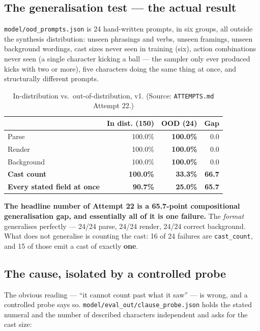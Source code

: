 \documentclass[11pt]{article}
\begin{document}
\subsection{The generalisation test --- the actual result}
\label{sec:generalisationtest}

\texttt{model/ood\_prompts.json} is 24 hand-written prompts, in six
groups, all outside the synthesis distribution: unseen phrasings and
verbs, unseen framings, unseen background wordings, cast sizes never seen
in training (six), action combinations never seen (a single character
kicking a ball --- the sampler only ever produced kicks with two or
more), five characters doing the same thing at once, and structurally
different prompts.

\begin{table}[h]
\centering
\caption{In-distribution vs.\ out-of-distribution, v1.
(Source: \texttt{ATTEMPTS.md} Attempt 22.)}
\label{tab:v1oodgap}
\begin{tabular}{@{}lrrr@{}}
\toprule
 & In dist. (150) & OOD (24) & Gap \\
\midrule
Parse & 100.0\% & \textbf{100.0\%} & 0.0 \\
Render & 100.0\% & \textbf{100.0\%} & 0.0 \\
Background & 100.0\% & \textbf{100.0\%} & 0.0 \\
\textbf{Cast count} & \textbf{100.0\%} & \textbf{33.3\%} & \textbf{66.7} \\
\textbf{Every stated field at once} & \textbf{90.7\%} & \textbf{25.0\%} & \textbf{65.7} \\
\bottomrule
\end{tabular}
\end{table}

\textbf{The headline number of Attempt 22 is a 65.7-point compositional
generalisation gap, and essentially all of it is one failure.} The
\emph{format} generalises perfectly --- 24/24 parse, 24/24 render, 24/24
correct background. What does not generalise is counting the cast: 16 of
24 failures are \texttt{cast\_count}, and 15 of those emit a cast of
exactly \textbf{one}.

\subsection{The cause, isolated by a controlled probe}
\label{sec:causeprobe}

The obvious reading --- ``it cannot count past what it saw'' --- is
wrong, and a controlled probe says so. \texttt{model/eval\_out/clause\_probe.json}
holds the stated numeral and the number of described characters
independent and asks for the cast size:
\end{document}
